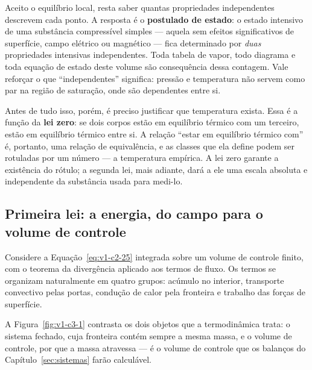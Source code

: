 \documentclass[12pt,a4paper]{article}
\numberwithin{equation}{section}
\numberwithin{table}{section}
\numberwithin{figure}{section}
\begin{document}
Aceito o equilíbrio local, resta saber quantas propriedades independentes
descrevem cada ponto. A resposta é o \textbf{postulado de estado}: o estado
intensivo de uma substância compressível simples --- aquela sem efeitos
significativos de superfície, campo elétrico ou magnético --- fica determinado
por \emph{duas} propriedades intensivas independentes. Toda tabela de vapor,
todo diagrama e toda equação de estado deste volume são consequência dessa
contagem. Vale reforçar o que ``independentes'' significa: pressão e
temperatura não servem como par na região de saturação, onde são dependentes
entre si.

Antes de tudo isso, porém, é preciso justificar que temperatura exista. Essa é
a função da \textbf{lei zero}: se dois corpos estão em equilíbrio térmico com
um terceiro, estão em equilíbrio térmico entre si. A relação ``estar em
equilíbrio térmico com'' é, portanto, uma relação de equivalência, e as classes
que ela define podem ser rotuladas por um número --- a temperatura empírica. A
lei zero garante a existência do rótulo; a segunda lei, mais adiante, dará a
ele uma escala absoluta e independente da substância usada para medi-lo.

\subsection{Primeira lei: a energia, do campo para o volume de controle}\label{sub:v1-c3-primeira}

Considere a Equação~\eqref{eq:v1-c2-25} integrada sobre um volume de controle
finito, com o teorema da divergência aplicado aos termos de fluxo. Os termos se
organizam naturalmente em quatro grupos: acúmulo no interior, transporte
convectivo pelas portas, condução de calor pela fronteira e trabalho das forças
de superfície.

A Figura~\ref{fig:v1-c3-1} contrasta os dois objetos que a termodinâmica
trata: o sistema fechado, cuja fronteira contém sempre a mesma massa, e o
volume de controle, por que a massa atravessa --- é o volume de controle que
os balanços do Capítulo~\ref{sec:sistemas} farão calculável.
\end{document}

